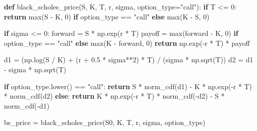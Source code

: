 \documentclass[
  11pt,
]{article}
\newenvironment{Shaded}{}{}
\newcommand{\BuiltInTok}[1]{\textcolor[rgb]{0.00,0.50,0.00}{#1}}
\newcommand{\ControlFlowTok}[1]{\textcolor[rgb]{0.00,0.44,0.13}{\textbf{#1}}}
\newcommand{\DecValTok}[1]{\textcolor[rgb]{0.25,0.63,0.44}{#1}}
\newcommand{\FloatTok}[1]{\textcolor[rgb]{0.25,0.63,0.44}{#1}}
\newcommand{\KeywordTok}[1]{\textcolor[rgb]{0.00,0.44,0.13}{\textbf{#1}}}
\newcommand{\NormalTok}[1]{#1}
\newcommand{\OperatorTok}[1]{\textcolor[rgb]{0.40,0.40,0.40}{#1}}
\newcommand{\StringTok}[1]{\textcolor[rgb]{0.25,0.44,0.63}{#1}}
\begin{document}
\begin{Shaded}
\begin{Highlighting}[]
\KeywordTok{def}\NormalTok{ black\_scholes\_price(S, K, T, r, sigma, option\_type}\OperatorTok{=}\StringTok{"call"}\NormalTok{):}
    \ControlFlowTok{if}\NormalTok{ T }\OperatorTok{\textless{}=} \DecValTok{0}\NormalTok{:}
        \ControlFlowTok{return} \BuiltInTok{max}\NormalTok{(S }\OperatorTok{{-}}\NormalTok{ K, }\DecValTok{0}\NormalTok{) }\ControlFlowTok{if}\NormalTok{ option\_type }\OperatorTok{==} \StringTok{"call"} \ControlFlowTok{else} \BuiltInTok{max}\NormalTok{(K }\OperatorTok{{-}}\NormalTok{ S, }\DecValTok{0}\NormalTok{)}

    \ControlFlowTok{if}\NormalTok{ sigma }\OperatorTok{\textless{}=} \DecValTok{0}\NormalTok{:}
\NormalTok{        forward }\OperatorTok{=}\NormalTok{ S }\OperatorTok{*}\NormalTok{ np.exp(r }\OperatorTok{*}\NormalTok{ T)}
\NormalTok{        payoff }\OperatorTok{=} \BuiltInTok{max}\NormalTok{(forward }\OperatorTok{{-}}\NormalTok{ K, }\DecValTok{0}\NormalTok{) }\ControlFlowTok{if}\NormalTok{ option\_type }\OperatorTok{==} \StringTok{"call"} \ControlFlowTok{else} \BuiltInTok{max}\NormalTok{(K }\OperatorTok{{-}}\NormalTok{ forward, }\DecValTok{0}\NormalTok{)}
        \ControlFlowTok{return}\NormalTok{ np.exp(}\OperatorTok{{-}}\NormalTok{r }\OperatorTok{*}\NormalTok{ T) }\OperatorTok{*}\NormalTok{ payoff}

\NormalTok{    d1 }\OperatorTok{=}\NormalTok{ (np.log(S }\OperatorTok{/}\NormalTok{ K) }\OperatorTok{+}\NormalTok{ (r }\OperatorTok{+} \FloatTok{0.5} \OperatorTok{*}\NormalTok{ sigma}\OperatorTok{**}\DecValTok{2}\NormalTok{) }\OperatorTok{*}\NormalTok{ T) }\OperatorTok{/}\NormalTok{ (sigma }\OperatorTok{*}\NormalTok{ np.sqrt(T))}
\NormalTok{    d2 }\OperatorTok{=}\NormalTok{ d1 }\OperatorTok{{-}}\NormalTok{ sigma }\OperatorTok{*}\NormalTok{ np.sqrt(T)}

    \ControlFlowTok{if}\NormalTok{ option\_type.lower() }\OperatorTok{==} \StringTok{"call"}\NormalTok{:}
        \ControlFlowTok{return}\NormalTok{ S }\OperatorTok{*}\NormalTok{ norm\_cdf(d1) }\OperatorTok{{-}}\NormalTok{ K }\OperatorTok{*}\NormalTok{ np.exp(}\OperatorTok{{-}}\NormalTok{r }\OperatorTok{*}\NormalTok{ T) }\OperatorTok{*}\NormalTok{ norm\_cdf(d2)}
    \ControlFlowTok{else}\NormalTok{:}
        \ControlFlowTok{return}\NormalTok{ K }\OperatorTok{*}\NormalTok{ np.exp(}\OperatorTok{{-}}\NormalTok{r }\OperatorTok{*}\NormalTok{ T) }\OperatorTok{*}\NormalTok{ norm\_cdf(}\OperatorTok{{-}}\NormalTok{d2) }\OperatorTok{{-}}\NormalTok{ S }\OperatorTok{*}\NormalTok{ norm\_cdf(}\OperatorTok{{-}}\NormalTok{d1)}

\NormalTok{bs\_price }\OperatorTok{=}\NormalTok{ black\_scholes\_price(S0, K, T, r, sigma, option\_type)}


\end{Highlighting}
\end{Shaded}
\end{document}
